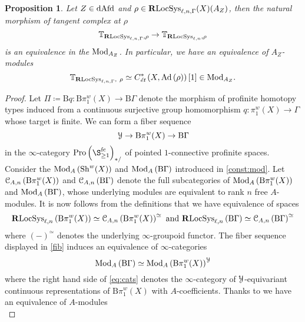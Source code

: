 \documentclass[10pt,a4paper]{amsart}
\numberwithin{equation}{subsection}
\theoremstyle{plain}
\newtheorem{prop}[theorem]{Proposition}
\theoremstyle{definition}
\theoremstyle{remark}
\numberwithin{equation}{section}
\begin{document}
\begin{prop} \label{tang_comp}
Let $Z \in \mathrm{dAfd}$ and $\rho \in \mathbf R \mathrm{LocSys}_{\ell, n, \Gamma}( X)(A_Z)$, then the natural morphism of tangent complex at $\rho$
	\[
		\mathbb T_{\mathbf R \mathrm{LocSys}_{\ell, n, \Gamma},  \rho} \to \mathbb T_{\mathbf R \mathrm{LocSys}_{\ell, n},  \rho}
	\]
is an equivalence in the \infcat $\mathrm{Mod}_{A_Z}$. In particular, we have an equivalence of $A_Z$-modules
	\[
		\mathbb T_{\mathbf R \mathrm{LocSys}_{\ell, n, \Gamma}, \  \rho} \simeq C^*_{\emph{\text{\'et}}} \left( X , \mathrm{Ad}  \left( \rho  \right)  \right) [1] \in \mathrm{Mod}_{A_Z}.
	\]
\end{prop}


\begin{proof}
Let  $\Pi \coloneqq \mathrm{B} q \colon \mathrm B \pi_1^w ( X) \to \mathrm B \Gamma$ denote the morphism of profinite homotopy types induced from a continuous surjective group homomorphism $q \colon \pi_1^w(X) \to \Gamma$ whose target is finite.
We can form a fiber sequence
	\begin{equation} \label{fib}
		\mathcal Y \to \mathrm B \pi_1^w(X) \to \mathrm B \Gamma
	\end{equation}
in the $\infty$-category $\pro \left( \S^{\mathrm{fc}}_{\geq 1} \right)_{*/}$ of pointed $1$-connective profinite spaces. Consider the \infcats $\mathrm{Mod}_A \left( \mathrm{Sh}^w( X) \right)$ and $\mathrm{Mod}_A \left( \mathrm B \Gamma \right)$ introduced in \cref{const:mod}. 
Let $\mathcal C_{A, n} \left( \mathrm B \pi_1^w(X) \right)$ and $\mathcal C_{A, n} \left( \mathrm B \Gamma \right)$ denote the full subcategories of $\mathrm{Mod}_A \left( \mathrm B \pi_1^w( X) \right)$ and $\mathrm{Mod}_A \left( \mathrm B \Gamma \right)$, whose underlying modules are
equivalent to rank
$n$
free $A$-modules. It is now follows from the definitions that we have equivalence of spaces 
	\[
		\mathbf R \mathrm{LocSys}_{\ell, n} \left( \mathrm B \pi_1^w(X) \right) \simeq \mathcal C_{A, n} \left( \mathrm B \pi_1^w(X) \right)^{\simeq} \text{ and } \mathbf R \mathrm{LocSys}_{\ell, n} \left( \mathrm B \Gamma \right) \simeq \mathcal C_{A, n } \left( \mathrm B \Gamma \right)^{\simeq}
	\]
where $(-)^{\simeq}$ denotes the underlying $\infty$-groupoid functor.
The fiber sequence displayed in \eqref{fib} induces an equivalence of $\infty$-categories
	\begin{equation} \label{eq:cats}
		\mathrm{Mod}_A \left( \mathrm B \Gamma \right) \simeq \mathrm{Mod}_A \left( \mathrm B \pi_1^w(X) \right)^\mathcal Y
	\end{equation}
where the right hand side of \eqref{eq:cats} denotes the $\infty$-category of $\mathcal Y$-equivariant
continuous representations of $\mathrm B \pi_1^w(X)$ with $A$-coefficients. Thanks to \cite[Proposition 4.4.9.]{me1} we have an equivalence of $A$-modules
	\begin{equation} \label{eq:tangSw}

\end{equation}
\end{proof}
\end{document}
